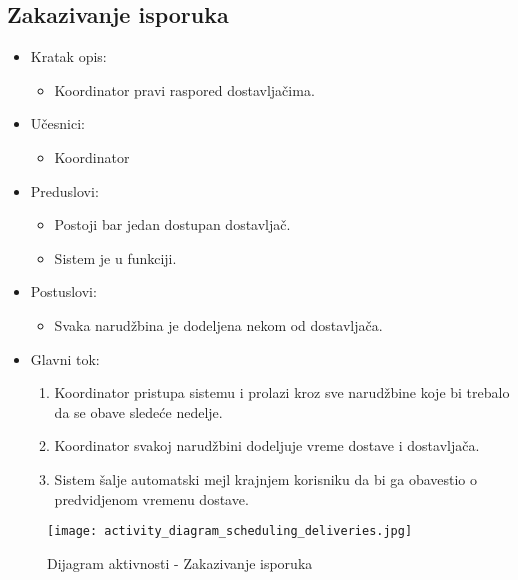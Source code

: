 
\subsection{\bfseries Zakazivanje isporuka }

\begin{itemize}
	\item Kratak opis:
		\begin{itemize}
			\item Koordinator pravi raspored dostavljačima.
		\end{itemize}
	\item Učesnici:
		\begin{itemize}
		    \item Koordinator
		\end{itemize}
	\item Preduslovi:
		\begin{itemize}
		    \item Postoji bar jedan dostupan dostavljač.
		    \item Sistem je u funkciji.
		\end{itemize}
	\item Postuslovi:
		\begin{itemize}
			\item Svaka narudžbina je dodeljena nekom od dostavljača.
	\end{itemize}
	\item Glavni tok:
		\begin{enumerate}
            \item Koordinator pristupa sistemu i prolazi kroz sve narudžbine koje bi trebalo da se obave sledeće nedelje.
           \item Koordinator svakoj narudžbini dodeljuje vreme dostave i dostavljača.
            \item Sistem šalje automatski mejl krajnjem korisniku da bi ga obavestio o predvidjenom vremenu dostave.
		\end{enumerate}
\end{itemize}

\begin{figure}[H]
\begin{center}
\texttt{[image: activity\_diagram\_scheduling\_deliveries.jpg]}
\end{center}
    \caption{Dijagram aktivnosti - Zakazivanje isporuka}
\label{fig:Activity_diagram_scheduling_deliveries}
\end{figure}

